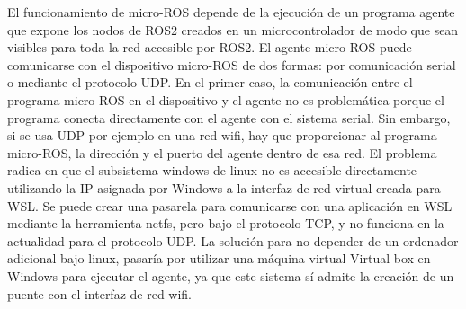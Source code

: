 El funcionamiento de micro-ROS depende de la ejecución de un programa agente que expone los nodos de ROS2 creados en un microcontrolador de modo que sean visibles para toda la red accesible por ROS2. El agente micro-ROS puede comunicarse con el dispositivo micro-ROS de dos formas: por comunicación serial o mediante el protocolo UDP. En el primer caso, la comunicación entre el programa micro-ROS en el dispositivo y el agente no es problemática porque el programa conecta directamente con el agente con el sistema serial. Sin embargo, si se usa UDP por ejemplo en una red wifi, hay que proporcionar al programa micro-ROS, la dirección y el puerto del agente dentro de esa red. El problema radica en que el subsistema windows de linux no es accesible directamente utilizando la IP asignada por Windows a la interfaz de red virtual creada para WSL. Se puede crear una pasarela para comunicarse con una aplicación en WSL mediante la herramienta netfs, pero bajo el protocolo TCP, y no funciona en la actualidad para el protocolo UDP. La solución para no depender de un ordenador adicional bajo linux, pasaría por utilizar una máquina virtual Virtual box en Windows para ejecutar el agente, ya que este sistema sí admite la creación de un puente con el interfaz de red wifi.
